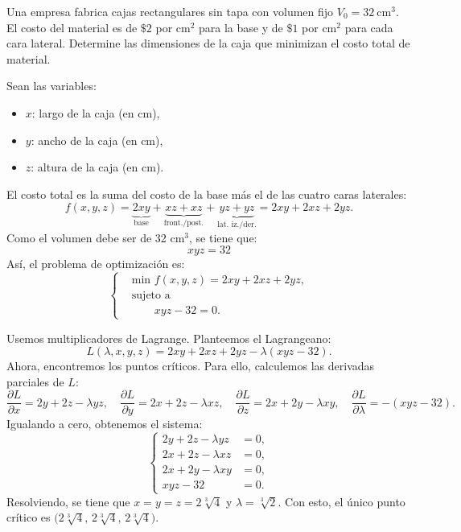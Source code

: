 \documentclass[11pt,respuestas,a4]{aleph-examen}
\begin{document}
\begin{preguntas}
\begin{respuesta}

\end{respuesta}

\item
Una empresa fabrica cajas rectangulares sin tapa con volumen fijo $V_0 = 32\ \text{cm}^3$. El costo del material es de $\$2$ por cm$^2$ para la base y de $\$1$ por cm$^2$ para cada cara lateral. Determine las dimensiones de la caja que minimizan el costo total de material.

\begin{respuesta}
Sean las variables:
\begin{itemize}
    \item $x$: largo de la caja (en cm),
    \item $y$: ancho de la caja (en cm),
    \item $z$: altura de la caja (en cm).
\end{itemize}
El costo total es la suma del costo de la base más el de las cuatro caras laterales:
\[
    f(x,y,z)
    =
    \underbrace{2xy}_{\text{base}}
    + \underbrace{xz + xz}_{\text{front./post.}}
    + \underbrace{yz + yz}_{\text{lat. iz./der.}}
    =
    2xy + 2xz + 2yz.
\]
Como el volumen debe ser de 32 $\text{cm}^3$, se tiene que:
\[
    xyz = 32
\]
Así, el problema de optimización es:
\[
    \left\{
    \begin{aligned}
        &\text{min }  f(x,y,z) = 2xy + 2xz + 2yz,\\
        &\text{sujeto a} \\
        &\qquad xyz - 32 = 0.
    \end{aligned}
    \right.
\]

Usemos multiplicadores de Lagrange. Planteemos el Lagrangeano:
\[
    L(\lambda,x,y,z) = 2xy + 2xz + 2yz - \lambda(xyz - 32).
\]
Ahora, encontremos los puntos críticos. Para ello, calculemos las derivadas parciales de $L$:
\[
    \frac{\partial L}{\partial x} = 2y + 2z - \lambda yz,\quad
    \frac{\partial L}{\partial y} = 2x + 2z - \lambda xz,\quad
    \frac{\partial L}{\partial z} = 2x + 2y - \lambda xy,\quad
    \frac{\partial L}{\partial \lambda} = -(xyz-32).
\]
Igualando a cero, obtenemos el sistema:
\[
    \left\{
    \begin{aligned}
        2y + 2z - \lambda yz &= 0,\\
        2x + 2z - \lambda xz &= 0,\\
        2x + 2y - \lambda xy &= 0,\\
        xyz - 32 &= 0.
    \end{aligned}
    \right.
\]
Resolviendo, se tiene que $x = y = z = 2\sqrt[3]{4}$ y $\lambda = \sqrt[3]{2}$. Con esto, el único punto crítico es $\bigl(2\sqrt[3]{4},\,2\sqrt[3]{4},\,2\sqrt[3]{4}\bigr)$.


\end{respuesta}
\end{preguntas}
\end{document}

